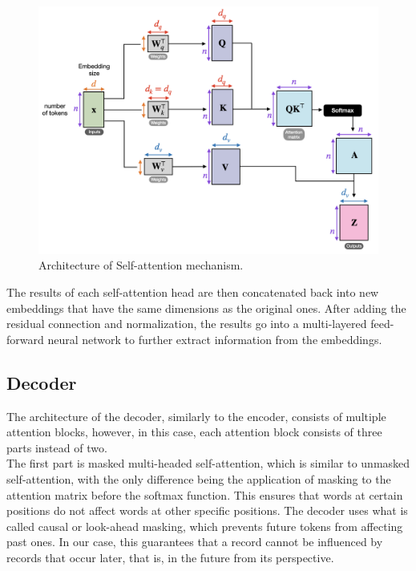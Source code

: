 \begin{figure}[!h]
	\centering
	
	\includegraphics[width=1\textwidth]{images/self_attention.png}
	
	\caption{Architecture of Self-attention mechanism.}
	\label{fig:self_att}
\end{figure}

The results of each self-attention head are then concatenated back into new embeddings that have the same dimensions as the original ones. After adding the residual connection and normalization, the results go into a multi-layered feed-forward neural network to further extract information from the embeddings.

\subsection{Decoder}

The architecture of the decoder, similarly to the encoder, consists of multiple attention blocks, however, in this case, each attention block consists of three parts instead of two.
\\

The first part is masked multi-headed self-attention, which is similar to unmasked self-attention, with the only difference being the application of masking to the attention matrix before the softmax function. This ensures that words at certain positions do not affect words at other specific positions. The decoder uses what is called causal or look-ahead masking, which prevents future tokens from affecting past ones. In our case, this guarantees that a record cannot be influenced by records that occur later, that is, in the future from its perspective.
\\

